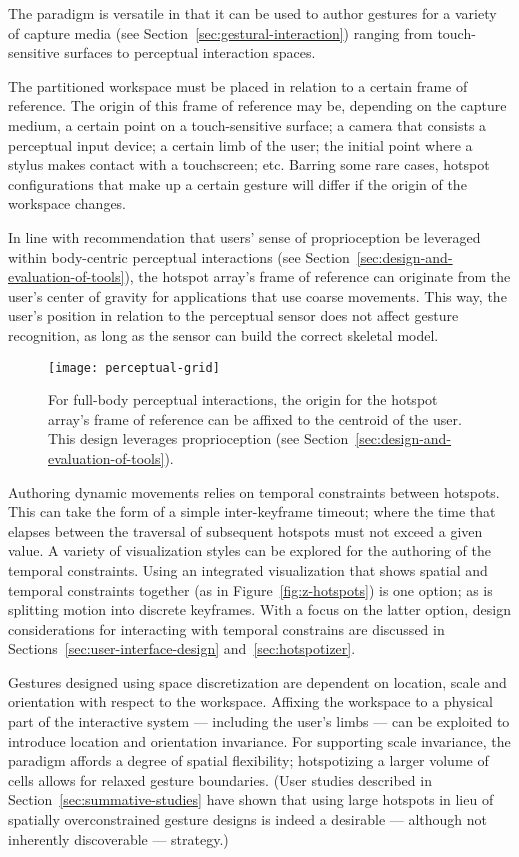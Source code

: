 The paradigm is versatile in that it can be used to author gestures for a variety of capture media (see Section~\ref{sec:gestural-interaction}) ranging from touch-sensitive surfaces to perceptual interaction spaces.

The partitioned workspace must be placed in relation to a certain frame of reference. The origin of this frame of reference may be, depending on the capture medium, a certain point on a touch-sensitive surface; a camera that consists a perceptual input device; a certain limb of the user; the initial point where a stylus makes contact with a touchscreen; etc. Barring some rare cases, hotspot configurations that make up a certain gesture will differ if the origin of the workspace changes.

In line with  recommendation that users' sense of proprioception be leveraged within body-centric perceptual interactions (see Section~\ref{sec:design-and-evaluation-of-tools}), the hotspot array's frame of reference can originate from the user's center of gravity for applications that use coarse movements. This way, the user's position in relation to the perceptual sensor does not affect gesture recognition, as long as the sensor can build the correct skeletal model.

\begin{SCfigure}[3][b]
\centering
\texttt{[image: perceptual-grid]}
\caption{For full-body perceptual interactions, the origin for the hotspot array's frame of reference can be affixed to the centroid of the user. This design leverages proprioception (see Section~\ref{sec:design-and-evaluation-of-tools}).}
\label{fig:perceptual-grid}
\end{SCfigure}

Authoring dynamic movements relies on temporal constraints between hotspots. This can take the form of a simple inter-keyframe timeout; where the time that elapses between the traversal of subsequent hotspots must not exceed a given value. A variety of visualization styles can be explored for the authoring of the temporal constraints. Using an integrated visualization that shows spatial and temporal constraints together (as in Figure~\ref{fig:z-hotspots}) is one option; as is splitting motion into discrete keyframes. With a focus on the latter option, design considerations for interacting with temporal constrains are discussed in  Sections~\ref{sec:user-interface-design} and~\ref{sec:hotspotizer}.

Gestures designed using space discretization are dependent on location, scale and orientation with respect to the workspace. Affixing the workspace to a physical part of the interactive system --- including the user's limbs --- can be exploited to introduce location and orientation invariance. For supporting scale invariance, the paradigm affords a degree of spatial flexibility; hotspotizing a larger volume of cells allows for relaxed gesture boundaries. (User studies described in Section~\ref{sec:summative-studies} have shown that using large hotspots in lieu of spatially overconstrained gesture designs is indeed a desirable --- although not inherently discoverable --- strategy.)

